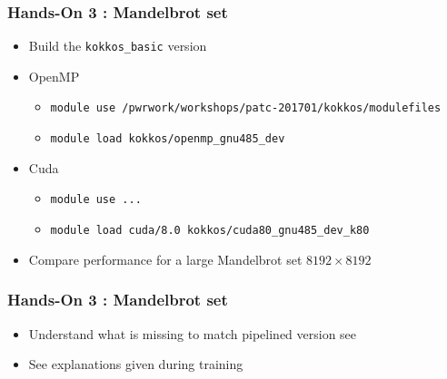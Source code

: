 \begin{frame}[fragile=singleslide]
  \frametitle{Hands-On 3 : Mandelbrot set}

  \begin{itemize}
  \item Build the \texttt{kokkos\_basic} version
  \item OpenMP
    \begin{itemize}
    \item \texttt{module use /pwrwork/workshops/patc-201701/kokkos/modulefiles}
    \item \texttt{module load kokkos/openmp_gnu485_dev}
    \end{itemize}
  \item Cuda
    \begin{itemize}
    \item \texttt{module use ...}
    \item \texttt{module load cuda/8.0 kokkos/cuda80_gnu485_dev_k80}
    \end{itemize}
  \item Compare performance for a large Mandelbrot set $8192\times 8192$
  \end{itemize}

\end{frame}
  
\begin{frame}[fragile=singleslide]
  \frametitle{Hands-On 3 : Mandelbrot set}

  \begin{itemize}
  \item Understand what is missing to match pipelined version see
  \item See explanations given during training
  \end{itemize}

\end{frame}
